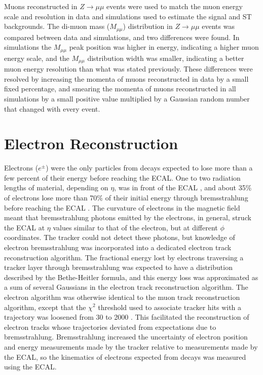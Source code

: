 Muons reconstructed in $Z \rightarrow \mu\mu$ events were used to match the muon energy scale and resolution in data 
and simulations used to estimate the \WR signal and ST backgrounds.  The di-muon mass ($M_{\mu\mu}$) distribution in 
$Z \rightarrow \mu\mu$ events was compared between data and simulations, and two differences were found.  In simulations 
the $M_{\mu\mu}$ peak position was higher in energy, indicating a higher muon energy scale, and the $M_{\mu\mu}$ distribution width 
was smaller, indicating a better muon energy resolution than what was stated previously.  These differences 
were resolved by increasing the momenta of muons reconstructed in data by a small fixed percentage, and smearing the momenta 
of muons reconstructed in all simulations by a small positive value multiplied by a Gaussian random number that changed 
with every event.


\section{Electron Reconstruction}
\label{sec:eleReco}
Electrons ($e^{\pm}$) were the only particles from \WR decays expected to lose more than a few percent of their 
energy before reaching the ECAL.  One to two radiation lengths of material, depending on $\eta$, was in front of 
the ECAL \cite{ecalPerformanceInCollisions}, and about 35\% of electrons lose more than 70\% of their initial energy 
through bremsstrahlung before reaching the ECAL \cite{trackerPerformanceInCollisions}.  The curvature of electrons 
in the magnetic field meant that bremsstrahlung photons emitted by the electrons, in general, struck the ECAL 
at $\eta$ values similar to that of the electron, but at different $\phi$ coordinates.  The tracker could not detect 
these photons, but knowledge of electron bremsstrahlung was incorporated into a dedicated electron track reconstruction 
algorithm.  The fractional energy lost by electrons traversing a tracker layer through bremsstrahlung was expected to 
have a distribution described by the Bethe-Heitler formula, and this energy loss was approximated as a sum of 
several Gaussians in the electron track reconstruction algorithm.  The electron algorithm was otherwise identical to 
the muon track reconstruction algorithm, except that the $\chi^{2}$ threshold used to 
associate tracker hits with a trajectory was loosened from 30 to 2000 \cite{trackerPerformanceInCollisions}.  This 
facilitated the reconstruction of electron tracks whose trajectories deviated from expectations due to bremsstrahlung.  
Bremsstrahlung increased the uncertainty of electron position and energy measurements made by the tracker relative to 
measurements made by the ECAL, so the kinematics of electrons expected from \WR decays was measured using the ECAL.


